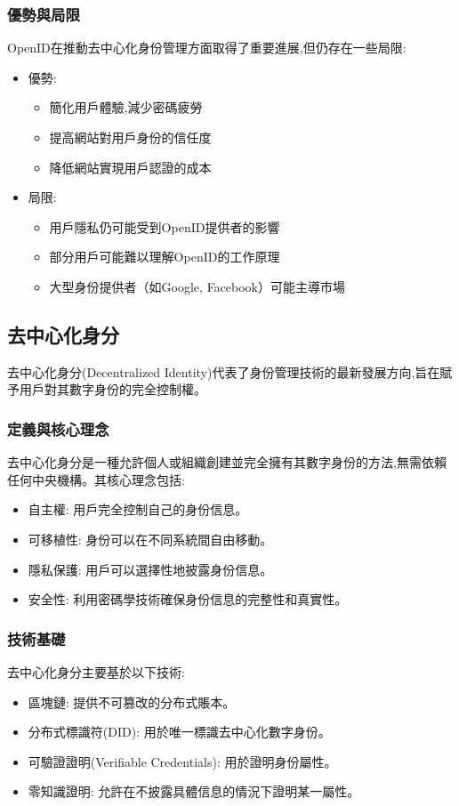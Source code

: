 \subsubsection{優勢與局限}
OpenID在推動去中心化身份管理方面取得了重要進展,但仍存在一些局限:
\begin{itemize}
  \item 優勢:
        \begin{itemize}
          \item 簡化用戶體驗,減少密碼疲勞
          \item 提高網站對用戶身份的信任度
          \item 降低網站實現用戶認證的成本
        \end{itemize}
  \item 局限:
        \begin{itemize}
          \item 用戶隱私仍可能受到OpenID提供者的影響
          \item 部分用戶可能難以理解OpenID的工作原理
          \item 大型身份提供者（如Google, Facebook）可能主導市場
        \end{itemize}
\end{itemize}

\subsection{去中心化身分}
去中心化身分(Decentralized Identity)代表了身份管理技術的最新發展方向,旨在賦予用戶對其數字身份的完全控制權。

\subsubsection{定義與核心理念}
去中心化身分是一種允許個人或組織創建並完全擁有其數字身份的方法,無需依賴任何中央機構。其核心理念包括:
\begin{itemize}
  \item 自主權: 用戶完全控制自己的身份信息。
  \item 可移植性: 身份可以在不同系統間自由移動。
  \item 隱私保護: 用戶可以選擇性地披露身份信息。
  \item 安全性: 利用密碼學技術確保身份信息的完整性和真實性。
\end{itemize}
\subsubsection{技術基礎}
去中心化身分主要基於以下技術:
\begin{itemize}
  \item 區塊鏈: 提供不可篡改的分布式賬本。
  \item 分布式標識符(DID): 用於唯一標識去中心化數字身份。
  \item 可驗證證明(Verifiable Credentials): 用於證明身份屬性。
  \item 零知識證明: 允許在不披露具體信息的情況下證明某一屬性。
\end{itemize}

